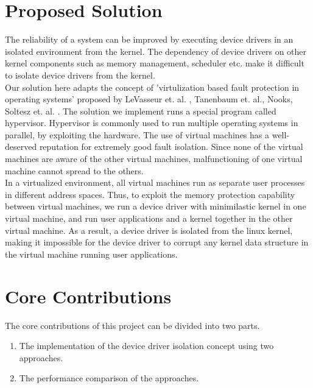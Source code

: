 \pagebreak
  
\section {Proposed Solution} 

The reliability of a system can be improved by executing device drivers in an isolated environment from the kernel. The dependency of device drivers on other kernel components such as memory management, scheduler etc. make it difficult to isolate device drivers from the kernel.
\\
Our solution here adapts the concept of 'virtulization based fault protection in operating systems' proposed by LeVasseur et. al. \cite{LeVasseur04UnmodifiedDriverReuse}, Tanenbaum et. al.\cite{Tanenbaum06canwe}, Nooks\cite{Swift:2002:NAR:1133373.1133393}, Soltesz et. al. \cite{Soltesz:2007:COS:1272998.1273025}. The solution we implement runs a special program called hypervisor. Hypervisor is commonly used to run multiple operating systems in parallel, by exploiting the hardware. The use of virtual machines has a well-deserved reputation for extremely good fault isolation. Since none of the virtual machines are aware of the other virtual machines, malfunctioning of one virtual machine cannot spread to the others.
\\
In a virtualized environment, all virtual machines run as separate user processes in different address spaces. Thus, to exploit the memory protection capability between virtual machines, we run a device driver with minimilastic kernel in one virtual machine, and run user applications and a kernel together in the other virtual machine. As a result, a device driver is isolated from the linux kernel, making it impossible for the device driver to corrupt any kernel data structure in the virtual machine running user applications. 

\pagebreak

\section{Core Contributions}

The core contributions of this project can be divided into two parts. 

\begin{enumerate}
\item The implementation of the device driver isolation concept using two approaches. 
\item The performance comparison of the approaches.
\end{enumerate}

